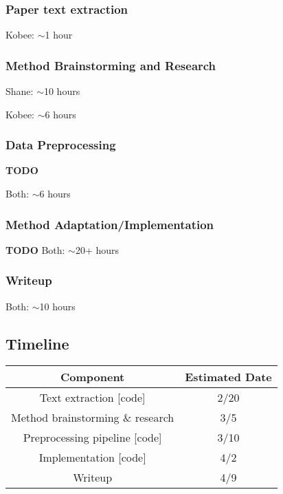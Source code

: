 \documentclass[conference]{sig-alternate-05-2015}
\begin{document}
\subsubsection{Paper text extraction}

Kobee: $\sim$1 hour

\subsubsection{Method Brainstorming and Research}

Shane: $\sim$10 hours

Kobee: $\sim$6 hours

\subsubsection{Data Preprocessing}

\textbf{TODO}

Both: $\sim$6 hours

\subsubsection{Method Adaptation/Implementation}

\textbf{TODO}
Both: $\sim$20+ hours

\subsubsection{Writeup}

Both: $\sim$10 hours

\subsection{Timeline}

\begin{center}
  \begin{tabular}{|c|c|} \hline

    \textbf{Component}                & \textbf{Estimated Date}    \\ \hline
    Text extraction [code]            & 2/20                       \\ \hline
    Method brainstorming \& research  & 3/5                        \\ \hline
    Preprocessing pipeline [code]     & 3/10                       \\ \hline
    Implementation [code]             & 4/2                        \\ \hline
    Writeup                           & 4/9                        \\ \hline

  \end{tabular}
\end{center}



\end{document}

